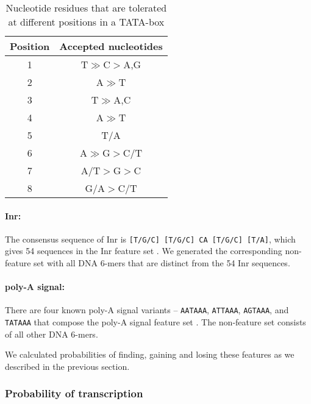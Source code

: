 \documentclass[12pt,a4paper]{article}
\begin{document}
\begin{table}[!t]
\centering
\begin{tabular}{c c}
\toprule
Position  & Accepted nucleotides \\ \midrule
1         & T$\gg$C$>$A,G        \\ \midrule
2         & A$\gg$T               \\ \midrule
3         & T$\gg$A,C             \\ \midrule
4         & A$\gg$T               \\ \midrule
5         & T/A                   \\ \midrule
6         & A$\gg$G$>$C/T         \\ \midrule
7         & A/T$>$G$>$C           \\ \midrule
8         & G/A$>$C/T             \\ \bottomrule
\end{tabular}
\caption{Nucleotide residues that are tolerated at different positions in a TATA-box \citep[based on][]{tata1}}
\label{tatatab}
\end{table}


\paragraph{Inr:} The consensus sequence of Inr is \texttt{[T/G/C] [T/G/C] CA [T/G/C] [T/A]}, which gives 54 sequences in the Inr feature set \citep{Inr}. We generated the corresponding non-feature set with all DNA 6-mers that are distinct from the 54 Inr sequences.

\paragraph{poly-A signal:} There are four known poly-A signal variants -- \texttt{AATAAA}, \texttt{ATTAAA}, \texttt{AGTAAA}, and \texttt{TATAAA} that compose the poly-A signal feature set \citep{polyA}. The non-feature set consists of all other DNA 6-mers.

\vspace{1\baselineskip}

We calculated probabilities of finding, gaining and losing these features as we described in the previous section.


\subsubsection{Probability of transcription}
\end{document}
